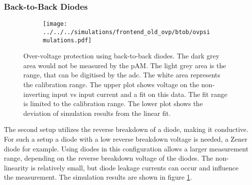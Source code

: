 \subsubsection*{Back-to-Back Diodes}
\begin{figure}
	\centering
	\begin{subfigure}{\textwidth}
		\centering
		\texttt{[image: ../../../simulations/frontend\_old\_ovp/btob/ovpsimulations.pdf]}
	\end{subfigure}
	\caption{Over-voltage protection using back-to-back diodes. The dark grey area would not be measured by the \ac{pAM}. The light grey area is the range, that can be digitised by the \ac{adc}. The white area represents the calibration range. The upper plot shows voltage on the non-inverting input vs input current and a fit on this data. The fit range is limited to the calibration range. The lower plot shows the deviation of simulation results from the linear fit.}
	\label{fig:ovpprinciples:sim:btob}
\end{figure}
The second setup utilizes the reverse breakdown of a diode, making it conductive. For such a setup a diode with a low reverse breakdown voltage is needed, a Zener diode for example.
Using diodes in this configuration allows a larger measurement range, depending on the reverse breakdown voltage of the diodes. The non-linearity is relatively small, but diode leakage currents can occur and influence the measurement. The simulation results are shown in figure \ref{fig:ovpprinciples:sim:btob}.

